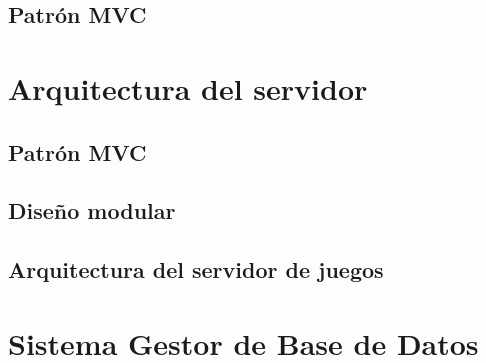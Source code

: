 \subsection{Patrón MVC}

\section{Arquitectura del servidor}

\subsection{Patrón MVC}

\subsection{Diseño modular}

\subsection{Arquitectura del servidor de juegos}

\section{Sistema Gestor de Base de Datos}



